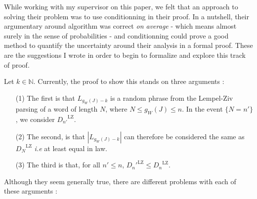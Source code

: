 \noindent
\hypertarget{critics}{}

While working with my supervisor on this paper, we felt that 
an approach to solving their problem was to use conditionning
in their proof. In a nutshell, their argumentary around 
algorithm was correct \emph{on average} - which means almost 
surely in the sense of probabilities - and conditionning could
prove a good method to quantify the uncertainty around their
analysis in a formal proof. These are the suggestions I wrote 
in order to begin to formalize and explore this track of proof.

Let $k \in\mathbb{N}$.
Currently, the proof to show this stands on three arguments :

\begin{itemize}
    \item[(1)] The first is that $L_{g_W(J)-k}$ is  
          a random phrase from the Lempel-Ziv parsing of 
          a word of length $N$, where $N \leq g_W(J) \leq n$.
          In the event $\{ N = n' \}$, we consider 
          ${D_{n'}}^{\text{LZ}}$.

    \item[(2)] The second, is that $|L_{g_W(J)-k}|$ can 
          therefore be considered the same as ${D_N}^{\text{LZ}}$
          \textit{i.e} at least equal in law.

    \item[(3)] The third is that, for all $n'\leq n$, 
        ${D_n'}^{\text{LZ}} \leq {D_n}^{\text{LZ}}$.
\end{itemize}
Although they seem generally true,
there are different problems with each of these arguments :

